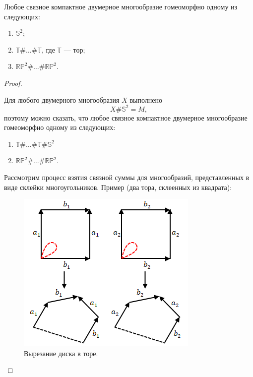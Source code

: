 \begin{theorem}
    Любое связное компактное двумерное многообразие гомеоморфно одному из следующих:
    \begin{enumerate}
        \item $\mathbb{S}^2$;
        \item $\mathbb{T} \# \dots \# \mathbb{T}$, где $\mathbb{T}$ — тор;
        \item $\mathbb{RP}^2 \# \dots \# \mathbb{RP}^2$.
    \end{enumerate}
\end{theorem} 
\begin{proof}
    \begin{remark}
        Для любого двумерного многообразия $X$ выполнено
        \[X \# \mathbb{S}^2 = M,\]
        поэтому можно сказать, что любое связное компактное двумерное многообразие гомеоморфно одному из следующих:
        \begin{enumerate}
            \item $\mathbb{T} \# \dots \# \mathbb{T} \# \mathbb{S}^2$
            \item $\mathbb{RP}^2 \# \dots \# \mathbb{RP}^2$.
        \end{enumerate}
    \end{remark}

    Рассмотрим процесс взятия связной суммы для многообразий, представленных в виде склейки многоугольников. Пример (два тора, склеенных из квадрата):

    \begin{figure}[htbp]
        \centering
        \includegraphics[scale=0.7]{images/c11.4.png}
        \caption{Вырезание диска в торе.}
        \label{fig:c11.4}
    \end{figure}


\end{proof}
